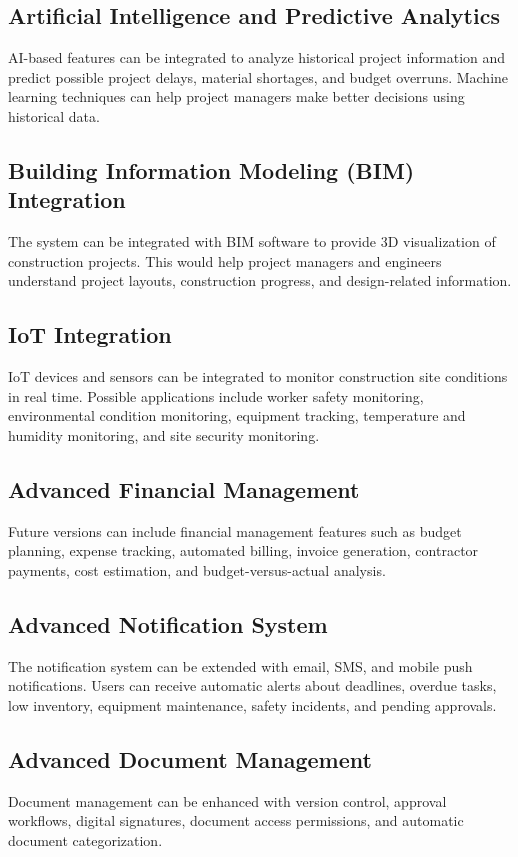 \documentclass[11pt,a4paper]{article}
\begin{document}
\subsection{Artificial Intelligence and Predictive Analytics}
AI-based features can be integrated to analyze historical project information and predict possible project delays, material shortages, and budget overruns. Machine learning techniques can help project managers make better decisions using historical data.

\subsection{Building Information Modeling (BIM) Integration}
The system can be integrated with BIM software to provide 3D visualization of construction projects. This would help project managers and engineers understand project layouts, construction progress, and design-related information.

\subsection{IoT Integration}
IoT devices and sensors can be integrated to monitor construction site conditions in real time. Possible applications include worker safety monitoring, environmental condition monitoring, equipment tracking, temperature and humidity monitoring, and site security monitoring.

\subsection{Advanced Financial Management}
Future versions can include financial management features such as budget planning, expense tracking, automated billing, invoice generation, contractor payments, cost estimation, and budget-versus-actual analysis.

\subsection{Advanced Notification System}
The notification system can be extended with email, SMS, and mobile push notifications. Users can receive automatic alerts about deadlines, overdue tasks, low inventory, equipment maintenance, safety incidents, and pending approvals.

\subsection{Advanced Document Management}
Document management can be enhanced with version control, approval workflows, digital signatures, document access permissions, and automatic document categorization.
\end{document}
